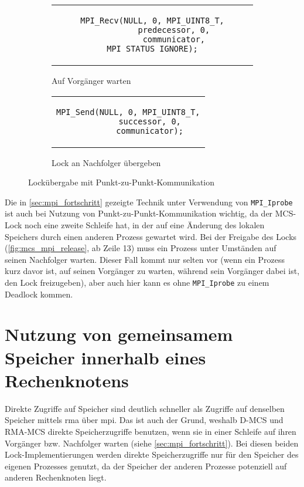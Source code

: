 \begin{figure}[h]
    \begin{subfigure}[b]{.5\textwidth}
        \centering
        \begin{tabular}{c}\begin{lstlisting}
MPI_Recv(NULL, 0, MPI_UINT8_T,
         predecessor, 0,
         communicator, MPI_STATUS_IGNORE);
        \end{lstlisting}\end{tabular}
        \caption{Auf Vorgänger warten}
        \label{fig:wait_recv}
    \end{subfigure}
    \begin{subfigure}[b]{.5\textwidth}
        \centering
        \begin{tabular}{c}\begin{lstlisting}
MPI_Send(NULL, 0, MPI_UINT8_T,
         successor, 0,
         communicator);
        \end{lstlisting}\end{tabular}
        \caption{Lock an Nachfolger übergeben}
        \label{fig:notify_send}
    \end{subfigure}
    \caption{Lockübergabe mit Punkt-zu-Punkt-Kommunikation}
    \label{fig:p2p_lock_passing}
\end{figure}

Die in \autoref{sec:mpi_fortschritt} gezeigte Technik unter Verwendung von \texttt{MPI\_Iprobe}
ist auch bei Nutzung von Punkt-zu-Punkt-Kommunikation wichtig,
da der MCS-Lock noch eine zweite Schleife hat,
in der auf eine Änderung des lokalen Speichers durch einen anderen Prozess gewartet wird.
Bei der Freigabe des Locks (\autoref{fig:mcs_mpi_release}, ab Zeile 13) muss ein Prozess unter Umständen auf seinen Nachfolger warten.
Dieser Fall kommt nur selten vor
(wenn ein Prozess kurz davor ist,
auf seinen Vorgänger zu warten,
während sein Vorgänger dabei ist,
den Lock freizugeben),
aber auch hier kann es ohne \texttt{MPI\_Iprobe} zu einem Deadlock kommen.

\section{Nutzung von gemeinsamem Speicher innerhalb eines Rechenknotens}
\label{sec:mpi_shared_mem}

Direkte Zugriffe auf Speicher sind deutlich schneller
als Zugriffe auf denselben Speicher mittels \gls{rma} über \gls{mpi}.
Das ist auch der Grund,
weshalb D-MCS und RMA-MCS \cite{RMA-RW} direkte Speicherzugriffe benutzen,
wenn sie in einer Schleife auf ihren Vorgänger bzw. Nachfolger warten (siehe \autoref{sec:mpi_fortschritt}).
Bei diesen beiden Lock-Implementierungen werden direkte Speicherzugriffe nur für den Speicher des eigenen Prozesses genutzt,
da der Speicher der anderen Prozesse potenziell auf anderen Rechenknoten liegt.


